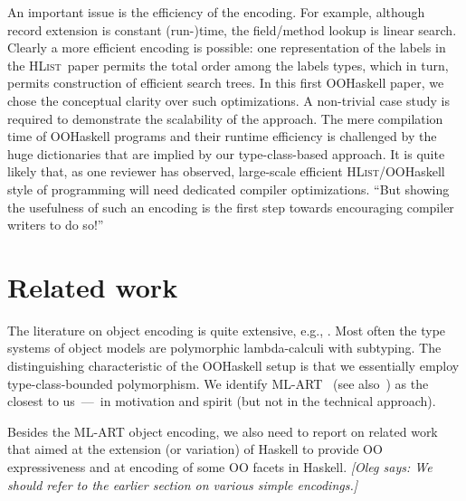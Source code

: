\documentclass{jfp}
\newcommand{\oleg}[1]{{\it [Oleg says: #1]}}
\newcommand{\HList}{\textsc{HList}}
\begin{document}
An important issue is the efficiency of the encoding.  For example,
although record extension is constant (run-)time, the field/method
lookup is linear search. Clearly a more efficient encoding is
possible: one representation of the labels in the \HList\ paper
permits the total order among the labels types, which in turn, permits
construction of efficient search trees. In this first OOHaskell paper,
we chose the conceptual clarity over such optimizations.  A
non-trivial case study is required to demonstrate the scalability of
the approach. The mere compilation time of OOHaskell programs and
their runtime efficiency is challenged by the huge dictionaries that
are implied by our type-class-based approach. It is quite likely that,
as one reviewer has observed, large-scale efficient
\HList/OOHaskell style of programming will need dedicated compiler
optimizations. ``But showing the usefulness of such an encoding is the
first step towards encouraging compiler writers to do so!''






\section{Related work}
\label{S:related}

The literature on object encoding is quite extensive, e.g.,
\cite{CW85, Poll97,AC96,Ohori95,PT94,BM92}. Most often the type
systems of object models are polymorphic lambda-calculi with
subtyping. The distinguishing characteristic of the OOHaskell setup is
that we essentially employ type-class-bounded polymorphism.  We identify
{ML-ART}~\cite{ML-ART} (see also~\cite{RV97}) as the closest to
us~---~in motivation and spirit (but not in the technical approach).

Besides the ML-ART object encoding, we also need to report on related
work that aimed at the extension (or variation) of Haskell to provide
OO expressiveness and at encoding of some OO facets in Haskell.
\oleg{We should refer to the earlier section on various simple encodings.}


\end{document}
